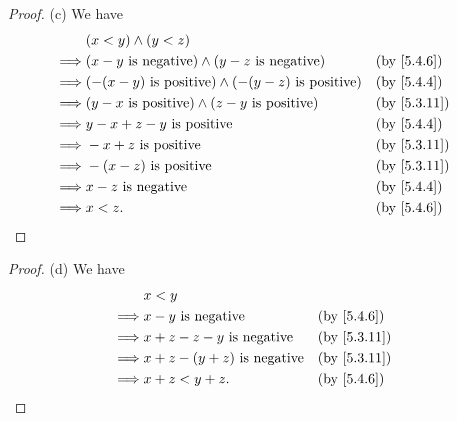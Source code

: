 \begin{proof}{(c)}
  We have
  \begin{align*}
             & (x < y) \land (y < z)                                                                              \\
    \implies & (x - y \text{ is negative}) \land (y - z \text{ is negative})       &  & \text{(by \cref{5.4.6})}  \\
    \implies & (-(x - y) \text{ is positive}) \land (-(y - z) \text{ is positive}) &  & \text{(by \cref{5.4.4})}  \\
    \implies & (y - x \text{ is positive}) \land (z - y \text{ is positive})       &  & \text{(by \cref{5.3.11})} \\
    \implies & y - x + z - y \text{ is positive}                                   &  & \text{(by \cref{5.4.4})}  \\
    \implies & - x + z \text{ is positive}                                         &  & \text{(by \cref{5.3.11})} \\
    \implies & -(x - z) \text{ is positive}                                        &  & \text{(by \cref{5.3.11})} \\
    \implies & x - z \text{ is negative}                                           &  & \text{(by \cref{5.4.4})}  \\
    \implies & x < z.                                                              &  & \text{(by \cref{5.4.6})}
  \end{align*}
\end{proof}

\begin{proof}{(d)}
  We have
  \begin{align*}
             & x < y                                                              \\
    \implies & x - y \text{ is negative}           &  & \text{(by \cref{5.4.6})}  \\
    \implies & x + z - z - y \text{ is negative}   &  & \text{(by \cref{5.3.11})} \\
    \implies & x + z - (y + z) \text{ is negative} &  & \text{(by \cref{5.3.11})} \\
    \implies & x + z < y + z.                      &  & \text{(by \cref{5.4.6})}
  \end{align*}
\end{proof}

